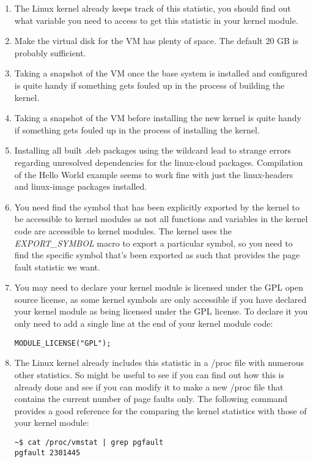 \documentclass[11pt]{article}
\begin{document}
\begin{enumerate}
\item The Linux kernel already keeps track of this statistic, you should find out what variable you need to access to get this statistic in your kernel module.
\item Make the virtual disk for the VM has plenty of space. The default 20 GB is probably sufficient. 
\item Taking a snapshot of the VM once the base system is installed and configured is quite handy if something gets fouled up in the process of building the kernel.
\item Taking a snapshot of the VM before installing the new kernel is quite handy if something gets fouled up in the process of installing the kernel.
\item Installing all built .deb packages using the wildcard lead to strange errors regarding unresolved dependencies for the linux-cloud packages. Compilation of the Hello World example seems to work fine with just the linux-headers and linux-image packages installed.
\item You need find the symbol that has been explicitly exported by the kernel to be accessible to kernel modules as not all functions and variables in the kernel code are accessible to kernel modules. The kernel uses the \emph{EXPORT\_SYMBOL} macro to export a particular symbol, so you need to find the specific symbol that's been exported as such that provides the page fault statistic we want.
\item You may need to declare your kernel module is licensed under the GPL open source license, as some kernel symbols are only accessible if you have declared your kernel module as being licensed under the GPL license. To declare it you only need to add a single line at the end of your kernel module code\cite{gpl}:

\begin{verbatim}
MODULE_LICENSE("GPL");
\end{verbatim}

\item The Linux kernel already includes this statistic in a /proc file with numerous other statistics. So might be useful to see if you can find out how this is already done and see if you can modify it to make a new /proc file that contains the current number of page faults only. The following command provides a good reference for the comparing the kernel statistics with those of your kernel module:

\begin{verbatim}
~$ cat /proc/vmstat | grep pgfault
pgfault 2301445
\end{verbatim}
\end{enumerate}
\end{document}
